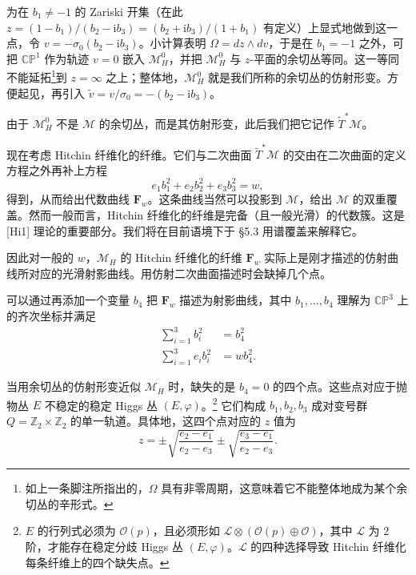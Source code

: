 为在 $b_1\ne-1$ 的 Zariski 开集（在此 $z=(1-b_1)/(b_2-\mathrm{i}b_3)=(b_2+\mathrm{i}b_3)/(1+b_1)$ 有定义）上显式地做到这一点，令 $v=-\sigma_0(b_2-\mathrm{i}b_3)$。小计算表明 $\Omega=dz\wedge dv$，于是在 $b_1=-1$ 之外，可把 $\mathbb{C}\mathbb{P}^1$ 作为轨迹 $v=0$ 嵌入 $\mathcal{M}_H^0$，并把 $\mathcal{M}_H^0$ 与 $z$-平面的余切丛等同。这一等同不能延拓\footnote{如上一条脚注所指出的，$\Omega$ 具有非零周期，这意味着它不能整体地成为某个余切丛的辛形式。}到 $z=\infty$ 之上；整体地，$\mathcal{M}_H^0$ 就是我们所称的余切丛的仿射形变。方便起见，再引入 $\tilde v=v/\sigma_0=-(b_2-\mathrm{i}b_3)$。

由于 $\mathcal{M}_H^0$ 不是 $\mathcal{M}$ 的余切丛，而是其仿射形变，此后我们把它记作 $\tilde{T}^*\mathcal{M}$。

现在考虑 Hitchin 纤维化的纤维。它们与二次曲面 $\tilde{T}^*\mathcal{M}$ 的交由在二次曲面的定义方程之外再补上方程
\begin{equation}\tag{3.43}
e_1b_1^2+e_2b_2^2+e_3b_3^2=w,
\end{equation}
得到，从而给出代数曲线 $\boldsymbol{F}_w$。这条曲线当然可以投影到 $\mathcal{M}$，给出 $\mathcal{M}$ 的双重覆盖。然而一般而言，Hitchin 纤维化的纤维是完备（且一般光滑）的代数簇。这是 [Hi1] 理论的重要部分。我们将在目前语境下于 §5.3 用谱覆盖来解释它。

因此对一般的 $w$，$\mathcal{M}_H$ 的 Hitchin 纤维化的纤维 $\boldsymbol{F}_w$ 实际上是刚才描述的仿射曲线所对应的光滑射影曲线。用仿射二次曲面描述时会缺掉几个点。

可以通过再添加一个变量 $b_4$ 把 $\boldsymbol{F}_w$ 描述为射影曲线，其中 $b_1,\dots,b_4$ 理解为 $\mathbb{C}\mathbb{P}^3$ 上的齐次坐标并满足
\begin{equation}\tag{3.44}
\begin{aligned}
\sum_{i=1}^3b_i^2&=b_4^2\\
\sum_{i=1}^3e_ib_i^2&=wb_4^2.
\end{aligned}
\end{equation}

当用余切丛的仿射形变近似 $\mathcal{M}_H$ 时，缺失的是 $b_4=0$ 的四个点。这些点对应于抛物丛 $E$ 不稳定的稳定 Higgs 丛 $(E,\varphi)$。\footnote{$E$ 的行列式必须为 $\mathcal{O}(p)$，且必须形如 $\mathcal{L}\otimes(\mathcal{O}(p)\oplus\mathcal{O})$，其中 $\mathcal{L}$ 为 2 阶，才能存在稳定分歧 Higgs 丛 $(E,\varphi)$。$\mathcal{L}$ 的四种选择导致 Hitchin 纤维化每条纤维上的四个缺失点。} 它们构成 $b_1,b_2,b_3$ 成对变号群 $Q=\mathbb{Z}_2\times\mathbb{Z}_2$ 的单一轨道。具体地，这四个点对应的 $z$ 值为
\begin{equation}\tag{3.45}
z=\pm\sqrt{\frac{e_2-e_1}{e_2-e_3}}\pm\sqrt{\frac{e_3-e_1}{e_2-e_3}}.
\end{equation}

